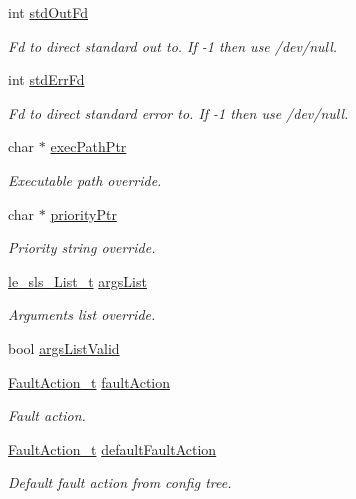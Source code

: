 \begin{DoxyCompactItemize}
int \hyperlink{struct_process__t_a5dd485ca4aee5af5845e511341ca167f}{std\+Out\+Fd}
\begin{DoxyCompactList}\small\item\em Fd to direct standard out to. If -\/1 then use /dev/null. \end{DoxyCompactList}\item 
int \hyperlink{struct_process__t_ae49bce7bce085f31dd320af067e72fbd}{std\+Err\+Fd}
\begin{DoxyCompactList}\small\item\em Fd to direct standard error to. If -\/1 then use /dev/null. \end{DoxyCompactList}\item 
char $\ast$ \hyperlink{struct_process__t_addf73f5ece64f5b18e863165e63d8d32}{exec\+Path\+Ptr}
\begin{DoxyCompactList}\small\item\em Executable path override. \end{DoxyCompactList}\item 
char $\ast$ \hyperlink{struct_process__t_a8d998605746321be5483a294a9170928}{priority\+Ptr}
\begin{DoxyCompactList}\small\item\em Priority string override. \end{DoxyCompactList}\item 
\hyperlink{structle__sls___list__t}{le\+\_\+sls\+\_\+\+List\+\_\+t} \hyperlink{struct_process__t_a496d07b1ced8331f7bbe196550c7afec}{args\+List}
\begin{DoxyCompactList}\small\item\em Arguments list override. \end{DoxyCompactList}\item 
bool \hyperlink{struct_process__t_a30c933c132f6793c5ff7787acd795359}{args\+List\+Valid}
\item 
\hyperlink{class_fault_action__t}{Fault\+Action\+\_\+t} \hyperlink{struct_process__t_acba5bd61337412adf18f9be2d6062cfd}{fault\+Action}
\begin{DoxyCompactList}\small\item\em Fault action. \end{DoxyCompactList}\item 
\hyperlink{class_fault_action__t}{Fault\+Action\+\_\+t} \hyperlink{struct_process__t_afb604a9c5b10d0a895abeec0ce50c1e4}{default\+Fault\+Action}
\begin{DoxyCompactList}\small\item\em Default fault action from config tree. \end{DoxyCompactList}\item 

\end{DoxyCompactItemize}
